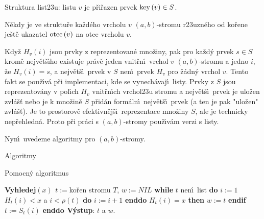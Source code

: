 \flushpar Struktura list\accent23u:\newline 
listu $v$ je p\v ri\v razen prvek $\operatorname{key}\left(v\right)\in S$.
\medskip

\flushpar N\v ekdy je ve struktu\v re ka\v zd\'eho vrcholu $v$ 
$\left(a,b\right)$-stromu r\accent23uzn\'eho od ko\v rene je\v st\v e ukazatel 
$\operatorname{otec}\left(v\right)$ na otce vrcholu $v$.
\medskip

\flushpar Kdy\v z $H_v\left(i\right)$ jsou prvky z reprezentovan\'e 
mno\v ziny, pak pro ka\v zd\'y prvek $s\in S$ krom\v e nejv\v et\v s\'\i ho 
existuje pr\'av\v e jeden vnit\v r\-n\'\i\ vrchol $v$ $\left(a,b\right)$-stromu 
a jedno $i$, \v ze $H_v\left(i\right)=s$, a nejv\v et\v s\'\i\ prvek v $S$ nen\'\i\ prvek 
$H_v$ pro \v z\'adn\'y vrchol $v$. Tento fakt se pou\v z\'\i v\'a p\v ri 
implementaci, kde se vynech\'avaj\'\i\ listy. Prvky z $S$ jsou 
reprezentov\'any v pol\'\i ch $H_v$ vnit\v r\-n\'\i ch vrchol\accent23u 
stromu 
a nejv\v et\v s\'\i\ prvek je ulo\v zen zvl\'a\v s\v t nebo je k mno\v zin\v e $S$ p\v rid\'an 
form\'aln\'\i\ nejv\v et\v s\'\i\ prvek (a ten je pak "ulo\v zen" zvl\'a\v s\v t). Je to prostorov\v e 
efektivn\v ej\v s\'\i\ reprezentace mno\v ziny $S$, ale je technicky 
nep\v rehledn\'a. Proto p\v ri pr\'aci s $\left(a,b\right)$-stromy pou\v z\'\i v\'am 
verzi s listy.
\medskip

\flushpar Nyn\'\i\ uvedeme algoritmy pro $\left(a,b\right)$-stromy.

\subhead 
Algoritmy
\endsubhead

\flushpar Pomocn\'y algoritmus
\bigskip

{\bf Vyhledej$\left(x\right)$\newline 
$t:=$}ko\v ren stromu $T$, $w:=NIL$\newline 
{\bf while} $t$ nen\'\i\ list {\bf do}\newline 
\phantom{---}$i:=1$\newline 
\phantom{---}{\bf while} $H_t\left(i\right)<x$ a $i<\rho \left(t\right)$ {\bf do} $i:=i+1$ {\bf enddo}\newline 
\phantom{---}{\bf if} $H_t\left(i\right)=x$ {\bf then} $w:=t$ {\bf endif}\newline 
$t:=S_t\left(i\right)$ {\bf enddo V\'ystup}: $t$ a $w$.
\medskip

